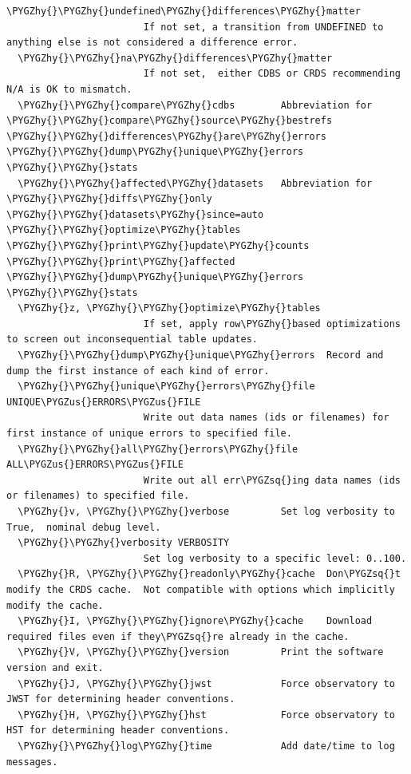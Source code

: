 \documentclass[letterpaper,10pt,english]{sphinxmanual}
\def\PYGZus{\char`\_}
\def\PYGZhy{\char`\-}
\def\PYGZsq{\char`\'}
\renewcommand\PYGZsq{\textquotesingle}
\begin{document}
\begin{Verbatim}[commandchars=\\\{\}]
  \PYGZhy{}\PYGZhy{}undefined\PYGZhy{}differences\PYGZhy{}matter
                        If not set, a transition from UNDEFINED to anything else is not considered a difference error.
  \PYGZhy{}\PYGZhy{}na\PYGZhy{}differences\PYGZhy{}matter
                        If not set,  either CDBS or CRDS recommending N/A is OK to mismatch.
  \PYGZhy{}\PYGZhy{}compare\PYGZhy{}cdbs        Abbreviation for \PYGZhy{}\PYGZhy{}compare\PYGZhy{}source\PYGZhy{}bestrefs \PYGZhy{}\PYGZhy{}differences\PYGZhy{}are\PYGZhy{}errors \PYGZhy{}\PYGZhy{}dump\PYGZhy{}unique\PYGZhy{}errors \PYGZhy{}\PYGZhy{}stats
  \PYGZhy{}\PYGZhy{}affected\PYGZhy{}datasets   Abbreviation for \PYGZhy{}\PYGZhy{}diffs\PYGZhy{}only \PYGZhy{}\PYGZhy{}datasets\PYGZhy{}since=auto \PYGZhy{}\PYGZhy{}optimize\PYGZhy{}tables \PYGZhy{}\PYGZhy{}print\PYGZhy{}update\PYGZhy{}counts \PYGZhy{}\PYGZhy{}print\PYGZhy{}affected \PYGZhy{}\PYGZhy{}dump\PYGZhy{}unique\PYGZhy{}errors \PYGZhy{}\PYGZhy{}stats
  \PYGZhy{}z, \PYGZhy{}\PYGZhy{}optimize\PYGZhy{}tables
                        If set, apply row\PYGZhy{}based optimizations to screen out inconsequential table updates.
  \PYGZhy{}\PYGZhy{}dump\PYGZhy{}unique\PYGZhy{}errors  Record and dump the first instance of each kind of error.
  \PYGZhy{}\PYGZhy{}unique\PYGZhy{}errors\PYGZhy{}file UNIQUE\PYGZus{}ERRORS\PYGZus{}FILE
                        Write out data names (ids or filenames) for first instance of unique errors to specified file.
  \PYGZhy{}\PYGZhy{}all\PYGZhy{}errors\PYGZhy{}file ALL\PYGZus{}ERRORS\PYGZus{}FILE
                        Write out all err\PYGZsq{}ing data names (ids or filenames) to specified file.
  \PYGZhy{}v, \PYGZhy{}\PYGZhy{}verbose         Set log verbosity to True,  nominal debug level.
  \PYGZhy{}\PYGZhy{}verbosity VERBOSITY
                        Set log verbosity to a specific level: 0..100.
  \PYGZhy{}R, \PYGZhy{}\PYGZhy{}readonly\PYGZhy{}cache  Don\PYGZsq{}t modify the CRDS cache.  Not compatible with options which implicitly modify the cache.
  \PYGZhy{}I, \PYGZhy{}\PYGZhy{}ignore\PYGZhy{}cache    Download required files even if they\PYGZsq{}re already in the cache.
  \PYGZhy{}V, \PYGZhy{}\PYGZhy{}version         Print the software version and exit.
  \PYGZhy{}J, \PYGZhy{}\PYGZhy{}jwst            Force observatory to JWST for determining header conventions.
  \PYGZhy{}H, \PYGZhy{}\PYGZhy{}hst             Force observatory to HST for determining header conventions.
  \PYGZhy{}\PYGZhy{}log\PYGZhy{}time            Add date/time to log messages.
\end{Verbatim}
\end{document}
